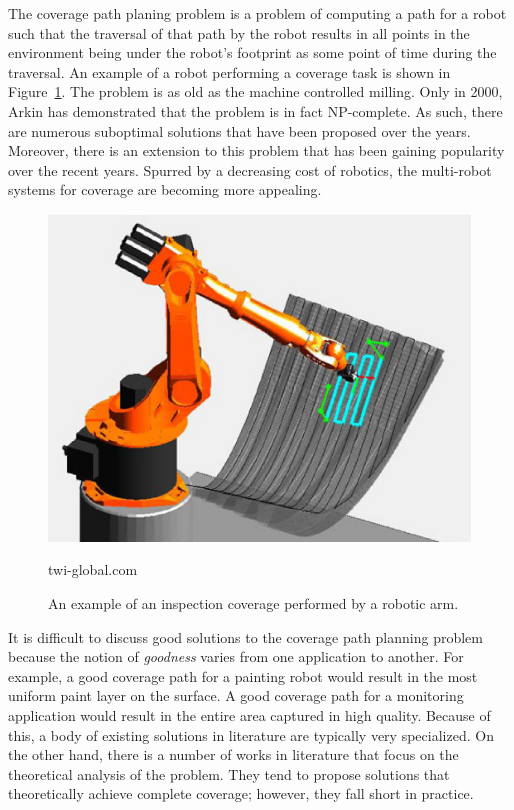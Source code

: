 \documentclass[../main.tex]{subfiles}
\begin{document}
The coverage path planing problem is a problem of computing a path for a robot such that the traversal of that path by the robot results in all points in the environment being under the robot's footprint as some point of time during the traversal. An example of a robot performing a coverage task is shown in Figure~\ref{img:example_coverage}. The problem is as old as the machine controlled milling. Only in 2000, Arkin\cite{arkin2000approximation} has demonstrated that the problem is in fact NP-complete. As such, there are numerous suboptimal solutions that have been proposed over the years. Moreover, there is an extension to this problem that has been gaining popularity over the recent years. Spurred by a decreasing cost of robotics, the multi-robot systems for coverage are becoming more appealing.
\begin{figure}
	\centering
	\includegraphics[scale=0.5]{img/chapter_1/example_coverage.eps}
	\vskip-15pt
	\caption*{\tiny twi-global.com}
	\caption{An example of an inspection coverage performed by a robotic arm.}
	\label{img:example_coverage}
\end{figure}

It is difficult to discuss good solutions to the coverage path planning problem because the notion of \emph{goodness} varies from one application to another. For example, a good coverage path for a painting robot would result in the most uniform paint layer on the surface. A good coverage path for a monitoring application would result in the entire area captured in high quality. Because of this, a body of existing solutions in literature are typically very specialized. On the other hand, there is a number of works in literature that focus on the theoretical analysis of the problem. They tend to propose solutions that theoretically achieve complete coverage; however, they fall short in practice.
\end{document}
